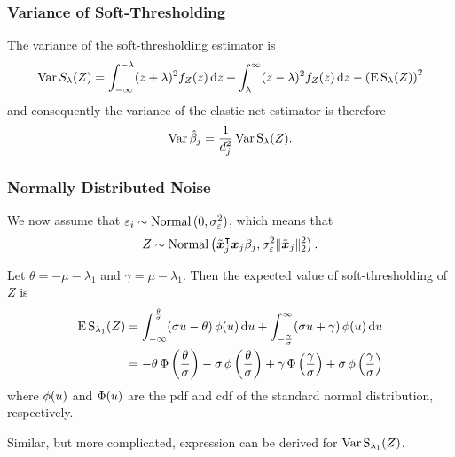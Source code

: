 \documentclass[10pt]{beamer}
\begin{document}
\begin{frame}[c]
  \frametitle{Variance of Soft-Thresholding}

  The variance of the soft-thresholding estimator is
  \begin{equation*}
    \operatorname{Var} {S_\lambda(Z)} = \int_{-\infty}^{-\lambda}(z + \lambda)^2f_Z(z) \mathop{}\!\mathrm{d} z + \int_{\lambda}^\infty (z - \lambda)^2 f_Z(z) \mathop{}\!\mathrm{d} z - \left(\operatorname{E} \operatorname{S}_\lambda(Z)\right)^2
  \end{equation*}
  and consequently the variance of the elastic net estimator is therefore
  \begin{equation*}
    \operatorname{Var} \hat\beta_j = \frac{1}{d_j^2} \operatorname{Var} \operatorname{S}_\lambda(Z).
  \end{equation*}

\end{frame}

\begin{frame}[c]
  \frametitle{Normally Distributed Noise}

  We now assume that \(\varepsilon_i \sim \operatorname{Normal}{(0, \sigma_\varepsilon^2)}\), which means that
  \[
    Z \sim \operatorname{Normal}\left(\tilde{\boldsymbol{x}}_j^\intercal\boldsymbol{x}_j \beta_j, \sigma_\varepsilon^2 \lVert \tilde{\boldsymbol{x}}_j\rVert_2^2 \right).
  \]

  Let \(\theta = -\mu -\lambda_1 \) and \(\gamma = \mu - \lambda_1\). Then the expected value of soft-thresholding of \(Z\) is
  \begin{align*}
    \operatorname{E} \operatorname{S}_{\lambda_1}(Z) & = \int_{-\infty}^\frac{\theta}{\sigma} (\sigma u - \theta) \operatorname{\phi}(u) \mathop{}\!\mathrm{d} u + \int_{-\frac{\gamma}{\sigma}}^\infty (\sigma u + \gamma) \operatorname{\phi}(u) \mathop{}\!\mathrm{d} u                                               \nonumber \\
                          & = -\theta \operatorname{\Phi}\left(\frac{\theta}{\sigma}\right) - \sigma \operatorname{\phi}\left(\frac{\theta}{\sigma}\right) + \gamma \operatorname{\Phi}\left(\frac{\gamma}{\sigma}\right) + \sigma \operatorname{\phi}\left(\frac{\gamma}{\sigma}\right)
  \end{align*}
  where \(\operatorname{\phi}(u)\) and \(\operatorname{\Phi}(u)\) are the pdf and cdf of the standard normal distribution, respectively.

  \bigskip\pause

  Similar, but more complicated, expression can be derived for \(\operatorname{Var} \operatorname{S}_{\lambda_1}(Z)\).

\end{frame}
\end{document}
